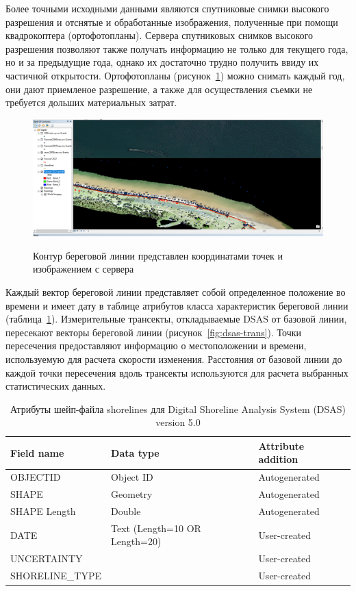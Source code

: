 \documentclass[732,14pt,final]{studrep}
\begin{document}
Более точными исходными данными являются спутниковые снимки высокого разрешения и отснятые и обработанные изображения, полученные при помощи квадрокоптера (ортофотопланы). Сервера спутниковых снимков высокого разрешения позволяют также получать информацию не только для текущего года, но и за предыдущие года, однако их достаточно трудно получить ввиду их частичной открытости. Ортофотопланы (рисунок~\ref{fig:ortho-src}) можно снимать каждый год, они дают приемленое разрешение, а также для осуществления съемки не требуется дольших материальных затрат.

\begin{figure}[htp]
  \centering
  \includegraphics[width=\linewidth]{pics/image12.png}\label{fig:ortho-src}
  \caption{Контур береговой линии представлен координатами точек и изображением с сервера}
\end{figure}

Каждый вектор береговой линии представляет собой определенное положение во времени и имеет дату в таблице атрибутов класса характеристик береговой линии (таблица~\ref{tbl:struct}). Измерительные трансекты, откладываемые DSAS от базовой линии, пересекают векторы береговой линии (рисунок~\ref{fig:dsas-trans}). Точки пересечения предоставляют информацию о местоположении и времени, используемую для расчета скорости изменения. Расстояния от базовой линии до каждой точки пересечения вдоль трансекты используются для расчета выбранных статистических данных.

\begin{table}
  \caption{Атрибуты шейп-файла shorelines для Digital Shoreline Analysis System (DSAS) version 5.0}\label{tbl:struct}
  \centering
  \begin{tabular}{|l|l|l|}
    \hline 
    Field name &	Data type &	Attribute addition\\\hline 
    OBJECTID	& Object ID	& Autogenerated\\
    SHAPE & 	Geometry	& Autogenerated\\
    SHAPE Length	& Double	& Autogenerated\\
    DATE	& Text (Length=10 OR Length=20)& User-created	\\
    UNCERTAINTY	& &	User-created	\\
    SHORELINE\_TYPE	& &	User-created\\
    \hline
  \end{tabular}
\end{table}
\end{document}

